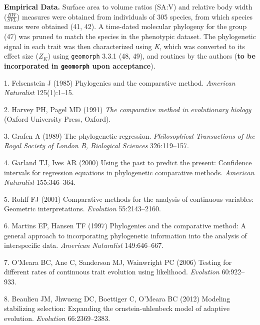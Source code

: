 \documentclass[9pt,twocolumn,twoside,lineno]{pnas-new}
\begin{document}
\textbf{Empirical Data.} Surface area to volume ratios (SA:V) and
relative body width (\(\frac{BW}{SVL}\)) measures were obtained from
individuals of 305 species, from which species means were obtained (41,
42). A time-dated molecular phylogeny for the group (47) was pruned to
match the species in the phenotypic dataset. The phylogenetic signal in
each trait was then characterized using \emph{K}, which was converted to
its effect size (\(Z_K\)) using \texttt{geomorph} 3.3.1 (48, 49), and
routines by the authors (\textbf{to be incorporated in \texttt{geomorph}
upon acceptance}).

\showmatmethods
\showacknow
\pnasbreak

\hypertarget{refs}{}
\leavevmode\hypertarget{ref-Felsenstein1985}{}%
1. Felsenstein J (1985) Phylogenies and the comparative method.
\emph{American Naturalist} 125(1):1--15.

\leavevmode\hypertarget{ref-HarveyPagel1991}{}%
2. Harvey PH, Pagel MD (1991) \emph{The comparative method in
evolutionary biology} (Oxford University Press, Oxford).

\leavevmode\hypertarget{ref-Grafen1989}{}%
3. Grafen A (1989) The phylogenetic regression. \emph{Philosophical
Transactions of the Royal Society of London B, Biological Sciences}
326:119--157.

\leavevmode\hypertarget{ref-GarlandIves2000}{}%
4. Garland TJ, Ives AR (2000) Using the past to predict the present:
Confidence intervals for regression equations in phylogenetic
comparative methods. \emph{American Naturalist} 155:346--364.

\leavevmode\hypertarget{ref-Rohlf2001}{}%
5. Rohlf FJ (2001) Comparative methods for the analysis of continuous
variables: Geometric interpretations. \emph{Evolution} 55:2143--2160.

\leavevmode\hypertarget{ref-MartinsHansen1997}{}%
6. Martins EP, Hansen TF (1997) Phylogenies and the comparative method:
A general approach to incorporating phylogenetic information into the
analysis of interspecific data. \emph{American Naturalist} 149:646--667.

\leavevmode\hypertarget{ref-OMeara_et_al2006}{}%
7. O'Meara BC, Ane C, Sanderson MJ, Wainwright PC (2006) Testing for
different rates of continuous trait evolution using likelihood.
\emph{Evolution} 60:922--933.

\leavevmode\hypertarget{ref-Beaulieu_et_al2012}{}%
8. Beaulieu JM, Jhwueng DC, Boettiger C, O'Meara BC (2012) Modeling
stabilizing selection: Expanding the ornstein-uhlenbeck model of
adaptive evolution. \emph{Evolution} 66:2369--2383.
\end{document}
